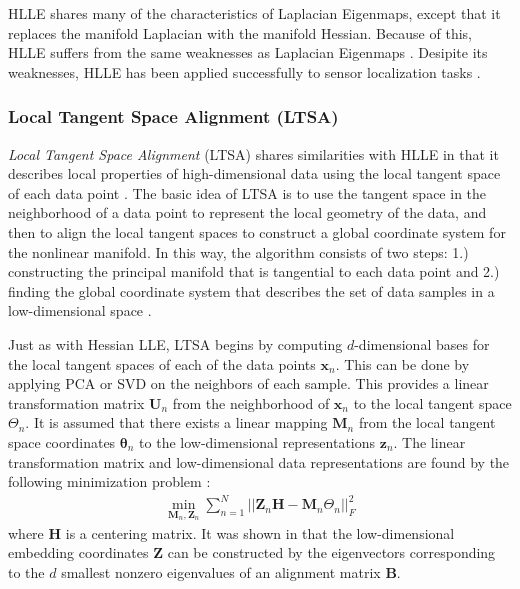 HLLE shares many of the characteristics of Laplacian Eigenmaps, except that it replaces the manifold Laplacian with the manifold Hessian.  Because of this, HLLE suffers from the same weaknesses as Laplacian Eigenmaps \citep{VanDerMaaten2009DRReview}.  Desipite its weaknesses, HLLE has been applied successfully to sensor localization tasks \citep{Patwari2004HLLESensorNetworks}.

\subsubsection{Local Tangent Space Alignment (LTSA)} \label{sec:LTSA}
\textit{Local Tangent Space Alignment} (LTSA) \citep{Zhang2002LTSA} shares similarities with HLLE in that it describes local properties of high-dimensional data using the local tangent space of each data point \citep{VanDerMaaten2009DRReview}.  The basic idea of LTSA is to use the tangent space in the neighborhood of a data point to represent the local geometry of the data, and then to align the local tangent spaces to construct a global coordinate system for the nonlinear manifold.  In this way, the algorithm consists of two steps: 1.) constructing the principal manifold that is tangential to each data point and 2.) finding the global coordinate system that describes the set of data samples in a low-dimensional space \citep{Zhang2002LTSA}.

Just as with Hessian LLE, LTSA begins by computing $d$-dimensional bases for the local tangent spaces of each of the data points $\bm{x}_{n}$.  This can be done by applying PCA or SVD on the neighbors of each sample.  This provides a linear transformation matrix $\bm{U}_{n}$ from the neighborhood of $\bm{x}_{n}$ to the local tangent space $\Theta_{n}$.  It is assumed that there exists a linear mapping $\bm{M}_{n}$ from the local tangent space coordinates $\bm{\theta}_{n}$ to the low-dimensional representations $\bm{z}_{n}$.  The linear transformation matrix and low-dimensional data representations are found by the following minimization problem \citep{Sorzano2014DRReview}:
\begin{align}
	\min_{\bm{M}_{n},\bm{Z}_{n}} \sum_{n=1}^{N} ||\bm{Z}_{n}\bm{H} - \bm{M}_{n}\Theta_{n} ||^{2}_{F}
\end{align}
\noindent
where $\bm{H}$ is a centering matrix.  It was shown in \citep{Zhang2002LTSA} that the low-dimensional embedding coordinates $\bm{Z}$ can be constructed by the eigenvectors corresponding to the $d$ smallest nonzero eigenvalues of an alignment matrix $\bm{B}$.  

